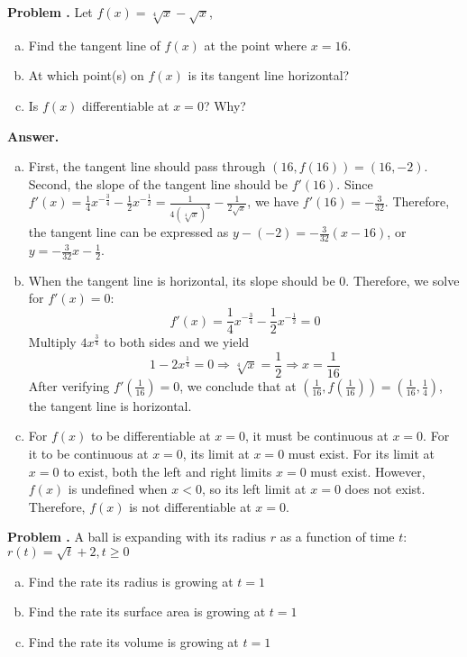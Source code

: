 \documentclass[11pt,letterpaper]{article}
\newcounter{problem}
\newcommand{\problem}{
	\stepcounter{problem}%
	\noindent \textbf{Problem \theproblem. }%
}
\newcommand{\answer}{\noindent \textbf{Answer. }}
\begin{document}
\problem Let $f(x) = \sqrt[4]{x} - \sqrt{x}$,
\begin{enumerate}[(a)]
    \item Find the tangent line of $f(x)$ at the point where $x=16$.
    \item At which point(s) on $f(x)$ is its tangent line horizontal?
    \item Is $f(x)$ differentiable at $x = 0$? Why?
\end{enumerate}\vspace{6mm}

\answer
\begin{enumerate}[(a)]
    \item First, the tangent line should pass through $(16, f(16)) = (16, -2)$.  Second, the slope of the tangent line should be $f'(16)$.  Since $f'(x) = \frac{1}{4}x^{-\frac{3}{4}} - \frac{1}{2}x^{-\frac{1}{2}} = \frac{1}{4(\sqrt[4]{x})^3} - \frac{1}{2\sqrt{x}}$, we have $f'(16) = -\frac{3}{32}$.  Therefore, the tangent line can be expressed as $y-(-2) = -\frac{3}{32}(x-16)$, or $y = -\frac{3}{32}x-\frac{1}{2}$.
    \item When the tangent line is horizontal, its slope should be $0$.  Therefore, we solve for $f'(x) = 0$:
    \[f'(x) = \frac{1}{4}x^{-\frac{3}{4}} - \frac{1}{2}x^{-\frac{1}{2}} = 0\]
    Multiply $4x^{\frac{3}{4}}$ to both sides and we yield
    \[1-2x^{\frac{1}{4}} = 0 \Rightarrow \sqrt[4]{x} = \frac{1}{2} \Rightarrow x = \frac{1}{16}\]
    After verifying $f'\left(\frac{1}{16}\right) = 0$, we conclude that at $\left(\frac{1}{16}, f\left(\frac{1}{16}\right)\right) = \left(\frac{1}{16}, \frac{1}{4}\right)$, the tangent line is horizontal.
    \item For $f(x)$ to be differentiable at $x=0$, it must be continuous at $x=0$.  For it to be continuous at $x=0$, its limit at $x=0$ must exist.  For its limit at $x=0$ to exist, both the left and right limits $x=0$ must exist.  However, $f(x)$ is undefined when $x < 0$, so its left limit at $x=0$ does not exist.  Therefore, $f(x)$ is not differentiable at $x=0$.
\end{enumerate}\vspace{6mm}

\problem A ball is expanding with its radius $r$ as a function of time $t$: $r(t) = \sqrt{t} + 2, t \ge 0$
\begin{enumerate}[(a)]
    \item Find the rate its radius is growing at $t = 1$
    \item Find the rate its surface area is growing at $t = 1$
    \item Find the rate its volume is growing at $t = 1$
\end{enumerate}\vspace{6mm}
\end{document}
